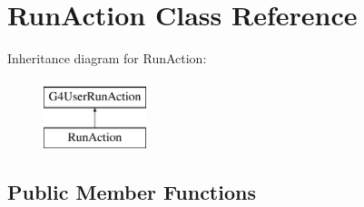 \hypertarget{class_run_action}{}\section{Run\+Action Class Reference}
\label{class_run_action}
Inheritance diagram for Run\+Action\+:\begin{figure}[H]
\begin{center}
\leavevmode
\includegraphics[height=2.000000cm]{class_run_action}
\end{center}
\end{figure}
\subsection*{Public Member Functions}

